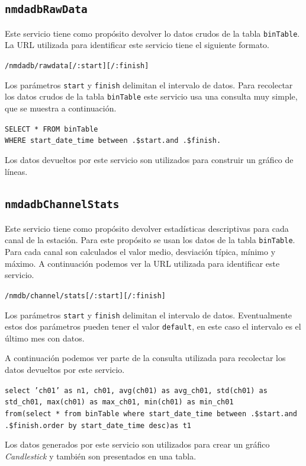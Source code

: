 {	\subsection{\texttt{nmdadbRawData}}
		Este servicio tiene como propósito devolver lo datos crudos de la tabla \texttt{binTable}. La URL utilizada para identificar este
		servicio tiene el siguiente formato. 
	  		\begin{center} \texttt{/nmdadb/rawdata[/:start][/:finish]}  \end{center} 
		Los parámetros \texttt{start} y \texttt{finish} delimitan el intervalo de datos. Para recolectar los datos crudos de la tabla
		\texttt{binTable} este servicio usa una consulta muy simple, que se muestra a continuación.
	  		\begin{center} \texttt{SELECT * FROM binTable 
			  		\\	WHERE start\_date\_time between \cc.\$start.\cc  and \cc.\$finish.\cc}
			\end{center} 
		Los datos devueltos por este servicio son utilizados para construir un gráfico de líneas.
	\subsection{\texttt{nmdadbChannelStats}}
		Este servicio tiene como propósito devolver estadísticas descriptivas para cada canal de la estación. Para este propósito se usan los
		datos de la tabla \texttt{binTable}. Para cada canal son calculados el valor medio, desviación típica, mínimo y máximo. A continuación
		podemos ver la URL utilizada para identificar este servicio.
	  		\begin{center} \texttt{/nmdb/channel/stats[/:start][/:finish]}  \end{center} 
		Los parámetros \texttt{start} y \texttt{finish} delimitan el intervalo de datos. Eventualmente estos dos parámetros pueden tener el
		valor \texttt{default}, en este caso el intervalo es el último mes con datos. 
		\par
		A continuación podemos ver parte de la consulta utilizada para recolectar los datos devueltos por este servicio.
	  		\begin{center} \texttt{select 'ch01' as n1, ch01, avg(ch01) as avg\_ch01, std(ch01) as std\_ch01, max(ch01) as max\_ch01, min(ch01) as min\_ch01
			  		\\	from(select * from  binTable where start\_date\_time between \cc.\$start.\cc and \cc.\$finish.\cc order by start\_date\_time desc)as t1}
			\end{center} 
		Los datos generados por este servicio son utilizados para crear un gráfico \emph{Candlestick} y también son presentados en una tabla.
}
